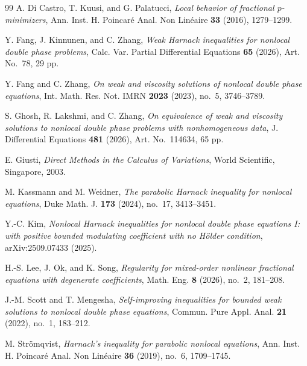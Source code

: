 \documentclass[reqno]{amsart}
\theoremstyle{plain}
\theoremstyle{definition}
\theoremstyle{remark}
\numberwithin{equation}{section}
\begin{document}
\begin{thebibliography}{99}
A. Di Castro, T. Kuusi, and G. Palatucci,
\emph{Local behavior of fractional $p$-minimizers},
Ann. Inst. H. Poincar\'{e} Anal. Non Lin\'{e}aire \textbf{33} (2016), 1279--1299.

Y. Fang, J. Kinnunen, and C. Zhang,
\emph{Weak Harnack inequalities for nonlocal double phase problems},
Calc. Var. Partial Differential Equations \textbf{65} (2026), Art. No.~78, 29 pp.

Y. Fang and C. Zhang,
\emph{On weak and viscosity solutions of nonlocal double phase equations},
Int. Math. Res. Not. IMRN \textbf{2023} (2023), no.~5, 3746--3789.

S. Ghosh, R. Lakshmi, and C. Zhang,
\emph{On equivalence of weak and viscosity solutions to nonlocal double phase problems with nonhomogeneous data},
J. Differential Equations \textbf{481} (2026), Art. No.~114634, 65 pp.

E. Giusti,
\emph{Direct Methods in the Calculus of Variations},
World Scientific, Singapore, 2003.


M. Kassmann and M. Weidner,
\emph{The parabolic Harnack inequality for nonlocal equations},
Duke Math. J. \textbf{173} (2024), no.~17, 3413--3451.


Y.-C. Kim,
\emph{Nonlocal Harnack inequalities for nonlocal double phase equations I: with positive bounded modulating coefficient with no H\"older condition},
arXiv:2509.07433 (2025).

H.-S. Lee, J. Ok, and K. Song,
\emph{Regularity for mixed-order nonlinear fractional equations with degenerate coefficients},
Math. Eng. \textbf{8} (2026), no.~2, 181--208.

J.-M. Scott and T. Mengesha,
\emph{Self-improving inequalities for bounded weak solutions to
	nonlocal double phase equations},
Commun. Pure Appl. Anal. \textbf{21} (2022), no.~1, 183--212.

M. Str\"omqvist,
\emph{Harnack's inequality for parabolic nonlocal equations},
Ann. Inst. H. Poincar\'e Anal. Non Lin\'eaire \textbf{36} (2019), no.~6,
1709--1745.
\end{thebibliography}
\end{document}
